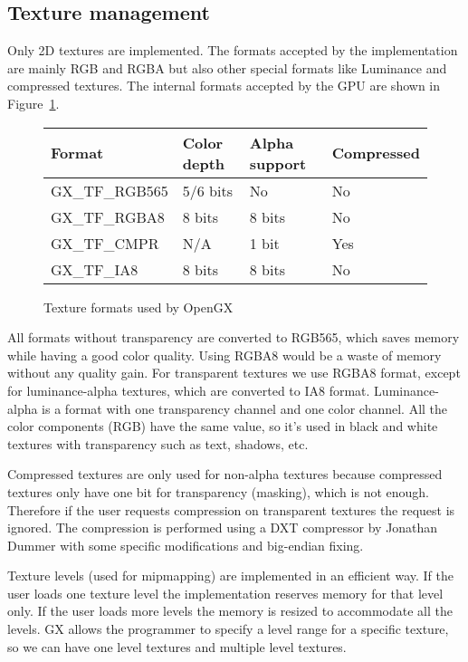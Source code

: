 \documentclass[12pt]{article}
\begin{document}
\subsection {Texture management}

Only 2D textures are implemented. The formats accepted by the implementation are mainly RGB and RGBA but also other special formats like Luminance and compressed textures. The internal formats accepted by the GPU are shown in Figure~\ref{table:format1}.

\begin{figure}[ht]
\centering

\begin{tabular}{|l|l|l|l|}
\hline
	Format & {Color depth} & {Alpha support} & Compressed \\
\hline
	GX\_TF\_RGB565 & 5/6 bits & No & No\\
\hline
	GX\_TF\_RGBA8  & 8 bits & 8 bits & No\\
\hline
	GX\_TF\_CMPR  & N/A & 1 bit & Yes\\
\hline
	GX\_TF\_IA8  & 8 bits & 8 bits & No \\
\hline
\end{tabular}
\caption{Texture formats used by OpenGX}
\label{table:format1}
\end {figure}

All formats without transparency are converted to RGB565, which saves memory while having a good color quality. Using RGBA8 would be a waste of memory without any quality gain. For transparent textures we use RGBA8 format, except for luminance-alpha textures, which are converted to IA8 format. Luminance-alpha is a format with one transparency channel and one color channel. All the color components (RGB) have the same value, so it's used in black and white textures with transparency such as text, shadows, etc.

Compressed textures are only used for non-alpha textures because compressed textures only have one bit for transparency (masking), which is not enough. Therefore if the user requests compression on transparent textures the request is ignored. The compression is performed using a DXT compressor by Jonathan Dummer \cite{dxt_cmp} with some specific modifications and big-endian fixing.

Texture levels (used for mipmapping) are implemented in an efficient way. If the user loads one texture level the implementation reserves memory for that level only. If the user loads more levels the memory is resized to accommodate all the levels. GX allows the programmer to specify a level range for a specific texture, so we can have one level textures and multiple level textures.
\end{document}
